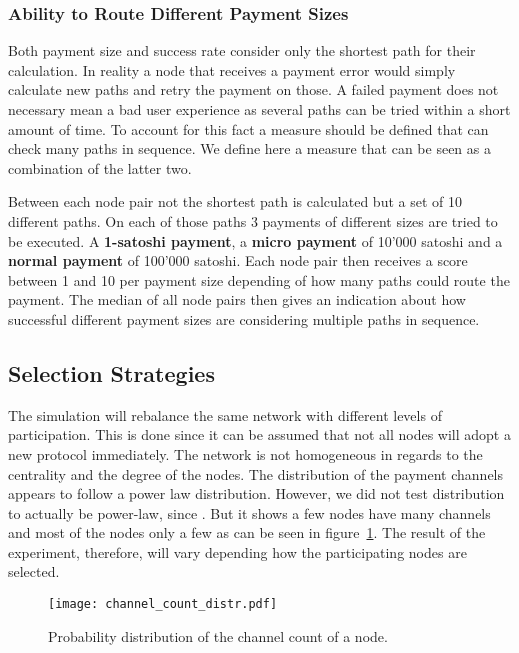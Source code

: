 \documentclass[final]{fhnwreport}       %
\begin{document}
\subsubsection{Ability to Route Different Payment Sizes}
Both payment size and success rate consider only the shortest path for their calculation. In reality a node that receives a payment error would simply calculate new paths and retry the payment on those. A failed payment does not necessary mean a bad user experience as several paths can be tried within a short amount of time. To account for this fact a measure should be defined that can check many paths in sequence. We define here a measure that can be seen as a combination of the latter two. 

Between each node pair not the shortest path is calculated but a set of 10 different paths. On each of those paths 3 payments of different sizes are tried to be executed. A \textbf{1-satoshi payment}, a \textbf{micro payment} of 10'000 satoshi and a \textbf{normal payment} of 100'000 satoshi. Each node pair then receives a score between 1 and 10 per payment size depending of how many paths could route the payment. The median of all node pairs then gives an indication about how successful different payment sizes are considering multiple paths in sequence. 

\subsection{Selection Strategies}\label{subsec:selstrat}
The simulation will rebalance the same network with different levels of participation. This is done since it can be assumed that not all nodes will adopt a new protocol immediately. The network is not homogeneous in regards to the centrality and the degree of the nodes. The distribution of the payment channels appears to follow a power law distribution. However, we did not test distribution to actually be power-law, since . But it shows a few nodes have many channels and most of the nodes only a few as can be seen in figure~\ref{fig:channelcount}. The result of the experiment, therefore, will vary depending how the participating nodes are selected. 

\begin{figure}[H]
\centering
\texttt{[image: channel\_count\_distr.pdf]}
\caption{Probability distribution of the channel count of a node.}
\label{fig:channelcount}
\end{figure}
\end{document}
